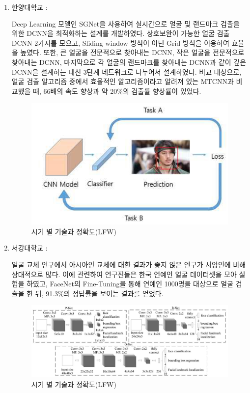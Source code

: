 \documentclass{oblivoir}
\begin{document}
\begin{enumerate}%
    \item 한양대학교 :

    Deep Learning 모델인 SGNet을 사용하여 실시간으로 얼굴 및 랜드마크 검출을 위한 DCNN을 최적화하는 설계를 개발하였다. 
    상호보완이 가능한 얼굴 검출 DCNN 2가지를 모으고, Sliding window 방식이 아닌 Grid 방식을 이용하여 효율을 높였다. 
    또한, 큰 얼굴을 전문적으로 찾아내는 DCNN, 작은 얼굴을 전문적으로 찾아내는 DCNN, 마지막으로 각 얼굴의 랜드마크를 찾아내는 DCNN과
    같이 깊은 DCNN을 설계하는 대신 3단계 네트워크로 나누어서 설계하였다. 비교 대상으로, 
    얼굴 검출 알고리즘 중에서 효율적인 알고리즘이라고 알려져 있는 MTCNN과 비교했을 때, 66배의 속도 향상과 약 20\%의 검출률 향상률이 있었다.

    \begin{figure}[h!]
        \centering
        \includegraphics{pic/chp1/img522}
        \caption{시기 별 기술과 정확도(LFW) \cite{reference6}}
    \end{figure}

    \item 서강대학교 : 

    얼굴 교체 연구에서 아시아인 교체에 대한 결과가 좋지 않은 연구가 서양인에 비해 상대적으로 많다.
    이에 관련하여 연구진들은 한국 연예인 얼굴 데이터셋을 모아 실험을 하였고, 
    FaceNet의 Fine-Tuning을 통해 연예인 1000명을 대상으로 얼굴 검출을 한 뒤, 
    91.3\%의 정답률을 보이는 결과를 얻었다.

    \begin{figure}[h!]
        \centering
        \includegraphics{pic/chp1/img523}
        \caption{시기 별 기술과 정확도(LFW) \cite{reference6}}
    \end{figure}


\end{enumerate}
\end{document}
